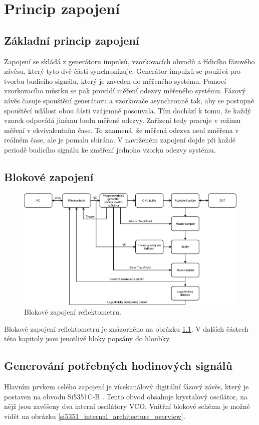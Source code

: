\chapter{Princip zapojení}

\section{Základní princip zapojení}
Zapojení se skládá z generátoru impulsů, vzorkovacích obvodů a řídicího fázového závěsu, který tyto dvě části synchronizuje. Generátor impulzů se používá pro tvorbu budicího signálu, který je zaveden do měřeného systému. Pomocí vzorkovacího můstku se pak provádí měření odezvy měřeného systému. Fázový závěs časuje spouštění generátoru a vzorkovače asynchronně tak, aby se postupně spouštěcí událost obou části vzájemně posouvala. Tím dochází k tomu, že každý vzorek odpovídá jinému bodu měřené odezvy. Zařízení tedy pracuje v režimu měření v ekvivalentním čase. To znamená, že měřená odezva není změřena v reálném čase, ale je pomalu sbírána. V navrženém zapojení dojde při každé periodě budicího signálu ke změření jednoho vzorku odezvy systému.

\section{Blokové zapojení}
\begin{figure}[htbp]
\includegraphics[width=\textwidth,keepaspectratio]{images/block_diagram.eps}\caption{Blokové zapojení reflektometru.} \label{block_diagram}
\end{figure}

Blokové zapojení reflektometru je znázorněno na obrázku \ref{block_diagram}. V dalších částech této kapitoly jsou jenotlivé bloky popsány do hloubky.

\section{Generování potřebných hodinových signálů}
Hlavním prvkem celého zapojení je vícekanálový digitální fázový závěs, který je postaven na obvodu Si5351C-B \cite{Si5351datasheet}. Tento obvod obsahuje krystalový oscilátor, na nějž jsou zavěšeny dva interní oscilátory \acrshort{VCO}. Vnitřní blokové schéma je možné vidět na obrázku \ref{si5351_internal_architecture_overview}.

